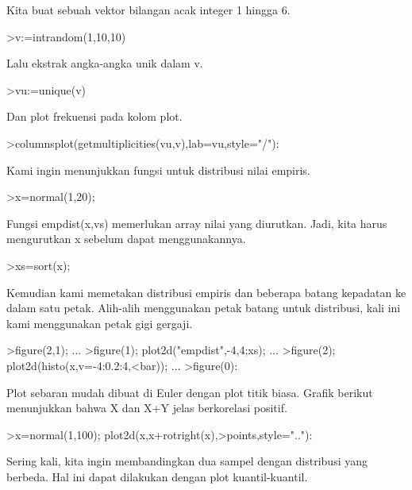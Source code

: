 \documentclass[a4paper,10pt]{article}
\begin{document}
\begin{eulernotebook}
\begin{eulercomment}
Kita buat sebuah vektor bilangan acak integer 1 hingga 6.
\end{eulercomment}
\begin{eulerprompt}
>v:=intrandom(1,10,10)
\end{eulerprompt}
\begin{euleroutput}
  [7,  4,  3,  1,  6,  10,  9,  7,  9,  7]
\end{euleroutput}
\begin{eulercomment}
Lalu ekstrak angka-angka unik dalam v.
\end{eulercomment}
\begin{eulerprompt}
>vu:=unique(v)
\end{eulerprompt}
\begin{euleroutput}
  [1,  3,  4,  6,  7,  9,  10]
\end{euleroutput}
\begin{eulercomment}
Dan plot frekuensi pada kolom plot.
\end{eulercomment}
\begin{eulerprompt}
>columnsplot(getmultiplicities(vu,v),lab=vu,style="/"):
\end{eulerprompt}
\begin{eulercomment}
Kami ingin menunjukkan fungsi untuk distribusi nilai empiris.
\end{eulercomment}
\begin{eulerprompt}
>x=normal(1,20);
\end{eulerprompt}
\begin{eulercomment}
Fungsi empdist(x,vs) memerlukan array nilai yang diurutkan. Jadi, kita
harus mengurutkan x sebelum dapat menggunakannya.
\end{eulercomment}
\begin{eulerprompt}
>xs=sort(x);
\end{eulerprompt}
\begin{eulercomment}
Kemudian kami memetakan distribusi empiris dan beberapa batang
kepadatan ke dalam satu petak. Alih-alih menggunakan petak batang
untuk distribusi, kali ini kami menggunakan petak gigi gergaji.
\end{eulercomment}
\begin{eulerprompt}
>figure(2,1); ...
>figure(1); plot2d("empdist",-4,4;xs); ...
>figure(2); plot2d(histo(x,v=-4:0.2:4,<bar));  ...
>figure(0):
\end{eulerprompt}
\begin{eulercomment}
Plot sebaran mudah dibuat di Euler dengan plot titik biasa. Grafik
berikut menunjukkan bahwa X dan X+Y jelas berkorelasi positif.
\end{eulercomment}
\begin{eulerprompt}
>x=normal(1,100); plot2d(x,x+rotright(x),>points,style=".."):
\end{eulerprompt}
\begin{eulercomment}
Sering kali, kita ingin membandingkan dua sampel dengan distribusi
yang berbeda. Hal ini dapat dilakukan dengan plot kuantil-kuantil.


\end{eulercomment}
\end{eulernotebook}
\end{document}

